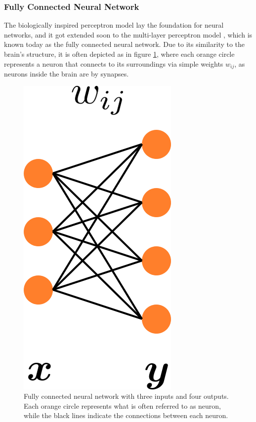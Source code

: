 \subsubsection{Fully Connected Neural Network}
The biologically inspired perceptron model \cite{viglione19704} lay the foundation for neural networks, and it got extended soon to the multi-layer perceptron model
\cite{ivakhnenko1971polynomial}, which is known today as the fully connected neural network. Due to its similarity to the brain's structure, it is often depicted as in figure \ref{fig::221_fully_connected}, where each orange circle represents a neuron that connects to its surroundings via simple weights $w_{ij}$, as neurons inside the brain are by synapses.
\begin{figure}[h!]
	\centering
	\includegraphics[scale=.28]{chapters/02_background/img/fully_connected.png}
	\caption{Fully connected neural network with three inputs and four outputs. Each orange circle represents what is often referred to as neuron, while the black lines indicate the connections between each neuron.}
	\label{fig::221_fully_connected}
\end{figure}
